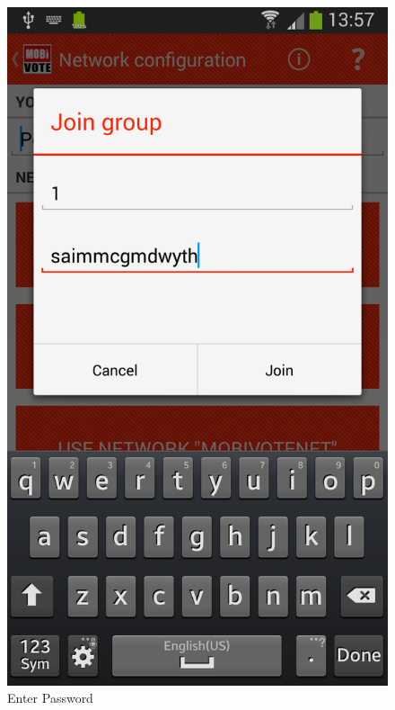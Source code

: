 \documentclass[numbers=noenddot, abstract=on, a4paper, headsepline,
footsepline, oneside, draft=off]{scrreprt}
\begin{document}
\begin{figure}[!htb]
\begin{minipage}{.5\textwidth}
		\includegraphics[height=.4\textheight]{img/screenshots/join_electorate_password}
		\caption{Enter Password}
		\label{fig:handbook_joinelectoratepassword}
	\end{minipage}
\end{figure}
\end{document}
